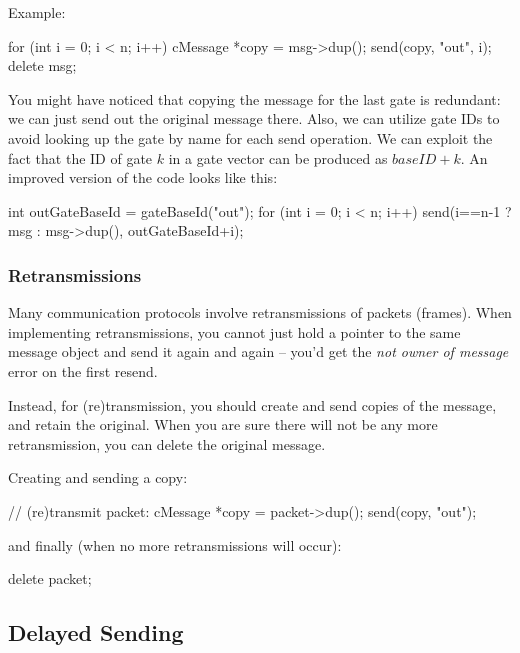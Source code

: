 \begin{ned}
Example:

\begin{cpp}
for (int i = 0; i < n; i++) {
    cMessage *copy = msg->dup();
    send(copy, "out", i);
}
delete msg;
\end{cpp}

You might have noticed that copying the message for the last gate is
redundant: we can just send out the original message there.
Also, we can utilize gate IDs to avoid looking up the gate by name
for each send operation. We can exploit the fact that the ID of gate
$k$ in a gate vector can be produced as ${baseID} + k$.
An improved version of the code looks like this:

\begin{cpp}
int outGateBaseId = gateBaseId("out");
for (int i = 0; i < n; i++)
    send(i==n-1 ? msg : msg->dup(), outGateBaseId+i);
\end{cpp}


\subsubsection{Retransmissions}
\label{sec:simple-modules:retransmissions}

Many communication protocols involve retransmissions of packets (frames).
When implementing retransmissions, you cannot just hold a pointer
to the same message object and send it again and again -- you'd get
the \textit{not owner of message} error on the first resend.

Instead, for (re)transmission, you should create and
send copies of the message, and retain the original.
When you are sure there will not be any more retransmission,
you can delete the original message.

Creating and sending a copy:

\begin{cpp}
// (re)transmit packet:
cMessage *copy = packet->dup();
send(copy, "out");
\end{cpp}

and finally (when no more retransmissions will occur):

\begin{cpp}
delete packet;
\end{cpp}


\subsection{Delayed Sending}
\label{sec:simple-modules:delayed-sending}


\end{ned}
